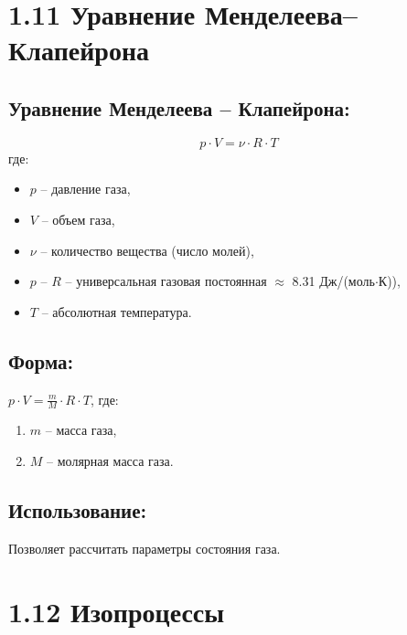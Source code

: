 \documentclass[a4paper,12pt]{article}
\begin{document}
\section*{1.11 Уравнение Менделеева–Клапейрона}

\vspace{-9pt}
\subsection*{Уравнение Менделеева – Клапейрона:}
\vspace{-3pt}
$$p \cdot V = \nu \cdot R \cdot T$$ 
где:
\begin{itemize}
    \item $p$ – давление газа,
    \item $V$ – объем газа,
    \item $\nu$ – количество вещества (число молей),
    \item $p$ – $R$ – универсальная газовая постоянная $\approx$ 8.31 Дж/(моль$\cdot$К)),
    \item $T$ – абсолютная температура.
\end{itemize}

\vspace{-9pt}
\subsection*{Форма:}
\vspace{-3pt}
$p \cdot V = \frac{m}{M}\cdot R\cdot T$, 
где: 
\begin{enumerate}
    \item $m$ – масса газа,
    \item $M$ – молярная масса газа.
\end{enumerate}

\vspace{-9pt}
\subsection*{Использование:}
\vspace{-3pt}
Позволяет рассчитать параметры состояния газа.



\newpage
\section*{1.12 Изопроцессы}

\vspace{-9pt}
\end{document}

